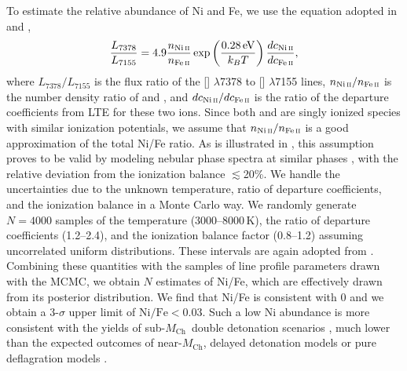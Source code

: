 \documentclass[twocolumn]{aastex631}
\newcommand{\Mch}{$M_\mathrm{Ch}$}
\begin{document}
\begin{CJK*}{UTF8}{gbsn}
To estimate the relative abundance of Ni and Fe, we use the equation adopted in \citet{Jerkstrand_2015} and \citet{Maguire_2018},
\begin{equation}
    \frac{L_{7378}}{L_{7155}} = 4.9\frac{n_{\mathrm{Ni}\,\textsc{ii}}}{n_{\mathrm{Fe}\,\textsc{ii}}}\exp\left(\frac{0.28\,\mathrm
    {eV}}{k_BT}\right)\frac{dc_{\mathrm{Ni}\,\textsc{ii}}}{dc_{\mathrm{Fe}\,\textsc{ii}}},
\end{equation}
where $L_{7378}/L_{7155}$ is the flux ratio of the [] $\lambda$7378 to [] $\lambda$7155 lines, $n_{\mathrm{Ni}\,\textsc{ii}}/n_{\mathrm{Fe}\,\textsc{ii}}$ is the number density ratio of  and , and ${dc_{\mathrm{Ni}\,\textsc{ii}}}/{dc_{\mathrm{Fe}\,\textsc{ii}}}$ is the ratio of the departure coefficients from LTE for these two ions. Since both  and  are singly ionized species with similar ionization potentials, we assume that $n_{\mathrm{Ni}\,\textsc{ii}}/n_{\mathrm{Fe}\,\textsc{ii}}$ is a good approximation of the total Ni/Fe ratio. As is illustrated in \citet{Maguire_2018}, this assumption proves to be valid by modeling nebular phase spectra at similar phases \citep{Fransson_2015,Shingles_2022}, with the relative deviation from the ionization balance $\lesssim$20\%. We handle the uncertainties due to the unknown temperature, ratio of departure coefficients, and the ionization balance in a Monte Carlo way. We randomly generate $N=4000$ samples of the temperature (3000--8000\,K), the ratio of departure coefficients (1.2--2.4), and the ionization balance factor (0.8--1.2) assuming uncorrelated uniform distributions. These intervals are again adopted from \citet{Maguire_2018}. Combining these quantities with the samples of line profile parameters drawn with the MCMC, we obtain $N$ estimates of Ni/Fe, which are effectively drawn from its posterior distribution. We find that Ni/Fe is consistent with 0 and we obtain a 3-$\sigma$ upper limit of $\mathrm{Ni/Fe}<0.03$. Such a low Ni abundance is more consistent with the yields of sub-\Mch\ double detonation scenarios \citep{Shen_DD_2018}, much lower than the expected outcomes of near-\Mch, delayed detonation models \citep{Seitenzahl_2013} or pure deflagration models \citep{Iwamoto_1999}.


\end{CJK*}
\end{document}
